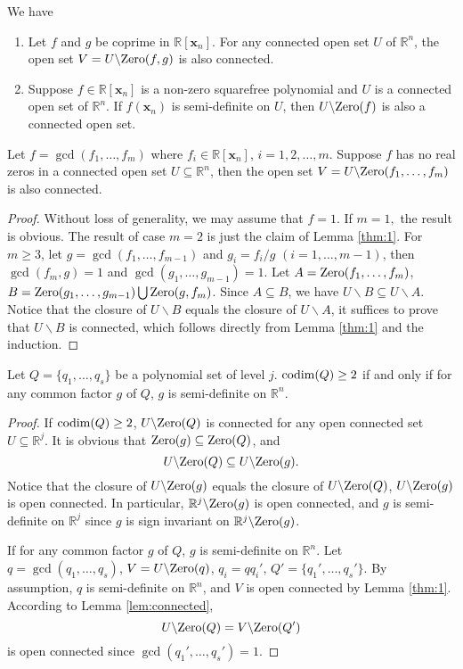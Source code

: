 \documentclass[amsthm]{elsart}
\def \codim {{\rm codim}}
\def  \zero {{\rm Zero}}
\def \RR {{\mathbb R}}
\newcommand{\xx}{\bm{x}}
\begin{document}
\begin{lem}\label{thm:1} \citep{han2016proving}
We have
\begin{enumerate}
\item Let $f$ and $g$ be coprime in $\RR[\xx_n]$. For any connected open set $U$ of $\RR^n$, the open set $V = U\backslash \zero(f,g)$ is also connected.

\item Suppose $f\in \RR[\xx_n]$ is a non-zero squarefree polynomial and $U$ is a connected open set of $\mathbb{R}^{n}$. If $f(\xx_n)$ is semi-definite on $U$, then $U\backslash \zero(f)$ is also a connected open set.
\end{enumerate}
\end{lem}

\begin{lem}\label{lem:connected} Let $f=\gcd(f_1,\ldots,f_m)$ where $f_i\in\RR[\xx_n]$, $i=1,2,\ldots,m.$ Suppose $f$ has no real zeros in a connected open set $U\subseteq\RR^n$, then the open set $V = U\backslash \zero(f_1,\ldots,f_m)$ is also connected.
\end{lem}
\begin{proof}
Without loss of generality, we may assume that $f=1$. If $m=1,$ the result is obvious. The result of case $m=2$ is just the claim of Lemma \ref{thm:1}. For $m\ge3$, let $g=\gcd(f_1,\ldots,f_{m-1})$ and $g_i=f_i/g$ $(i=1,\ldots,m-1)$, then $\gcd(f_m,g)=1$ and $\gcd(g_1,\ldots,g_{m-1})=1$. Let $A=\zero(f_1,\ldots,f_m)$, $B=\zero(g_1,\ldots,g_{m-1})\bigcup \zero(g,f_m)$.
Since $A\subseteq B$, we have $U\backslash B\subseteq U\backslash A$. Notice that the closure of ${U\backslash B}$ equals the closure of ${U\backslash A}$, it suffices to prove that $U\backslash B$ is connected, which follows directly from Lemma \ref{thm:1} and the induction.
\end{proof}

\begin{lem}\label{lem:codim2}
Let $Q=\{q_1,\ldots,q_s\}$ be a polynomial set of level $j$. $\codim(Q)\ge2$ if and only if for any common factor $g$ of $Q$, $g$ is semi-definite on $\RR^n$.
\end{lem}
\begin{proof}
  If $\codim(Q)\ge2$, $U\backslash\zero(Q)$ is connected for any open connected set $U\subseteq \RR^j$. It is obvious that $\zero(g)\subseteq\zero(Q)$, and
  $$U\backslash\zero(Q)\subseteq U\backslash\zero(g).$$
  Notice that the closure of $U\backslash\zero(g)$ equals the closure of $U\backslash\zero(Q)$, $U\backslash\zero(g)$ is open connected. In particular, $\RR^j\backslash\zero(g)$ is open connected, and $g$ is semi-definite on $\RR^j$ since $g$ is sign invariant on $\RR^j\backslash\zero(g)$.

If for any common factor $g$ of $Q$, $g$ is semi-definite on $\RR^n$. Let $q=\gcd(q_1,\ldots,q_s)$, $V=U\backslash\zero(q)$, $q_i=qq_i'$, $Q'=\{q_1',\ldots,q_s'\}$. By assumption, $q$ is semi-definite on $\RR^n$, and $V$ is open connected by Lemma \ref{thm:1}. According to Lemma \ref{lem:connected},
$$U\backslash\zero(Q)=V\backslash\zero(Q')$$
is open connected since $\gcd(q_1',\ldots,q_s')=1$.
\end{proof}
\end{document}
